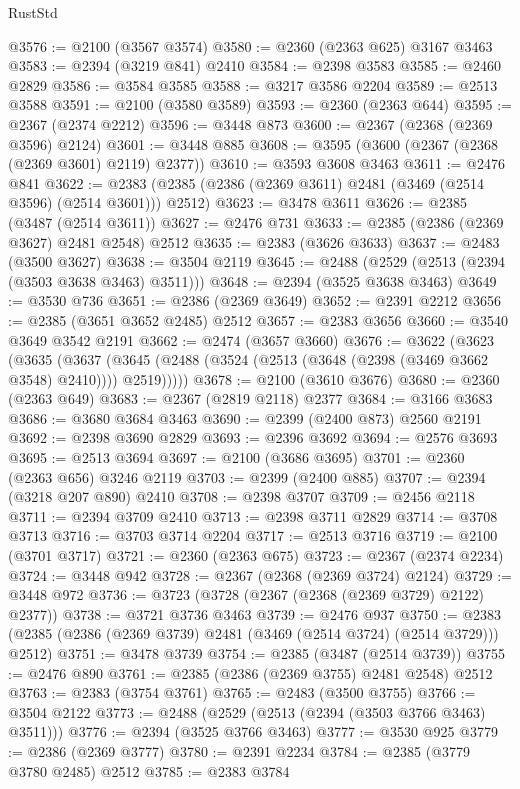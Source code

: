 \begin{lexlean}{RustStd}
\begin{coremodule}
{\begin{coremodule}
{{{{{{{{{{{{{{{{{{{{{{{{{{{{{{{{{{{{{{{{{{{{{{{{{{@3576 := @2100 (@3567 @3574)
@3580 := @2360 (@2363 @625) @3167 @3463
@3583 := @2394 (@3219 @841) @2410
@3584 := @2398 @3583
@3585 := @2460 @2829
@3586 := @3584 @3585
@3588 := @3217 @3586 @2204
@3589 := @2513 @3588
@3591 := @2100 (@3580 @3589)
@3593 := @2360 (@2363 @644)
@3595 := @2367 (@2374 @2212)
@3596 := @3448 @873
@3600 := @2367 (@2368 (@2369 @3596) @2124)
@3601 := @3448 @885
@3608 := @3595 (@3600 (@2367 (@2368 (@2369 @3601) @2119) @2377))
@3610 := @3593 @3608 @3463
@3611 := @2476 @841
@3622 := @2383 (@2385 (@2386 (@2369 @3611) @2481 (@3469 (@2514 @3596) (@2514 @3601))) @2512)
@3623 := @3478 @3611
@3626 := @2385 (@3487 (@2514 @3611))
@3627 := @2476 @731
@3633 := @2385 (@2386 (@2369 @3627) @2481 @2548) @2512
@3635 := @2383 (@3626 @3633)
@3637 := @2483 (@3500 @3627)
@3638 := @3504 @2119
@3645 := @2488 (@2529 (@2513 (@2394 (@3503 @3638 @3463) @3511)))
@3648 := @2394 (@3525 @3638 @3463)
@3649 := @3530 @736
@3651 := @2386 (@2369 @3649)
@3652 := @2391 @2212
@3656 := @2385 (@3651 @3652 @2485) @2512
@3657 := @2383 @3656
@3660 := @3540 @3649 @3542 @2191
@3662 := @2474 (@3657 @3660)
@3676 := @3622
    (@3623
      (@3635
        (@3637 (@3645 (@2488 (@3524 (@2513 (@3648 (@2398 (@3469 @3662 @3548) @2410)))) @2519)))))
@3678 := @2100 (@3610 @3676)
@3680 := @2360 (@2363 @649)
@3683 := @2367 (@2819 @2118) @2377
@3684 := @3166 @3683
@3686 := @3680 @3684 @3463
@3690 := @2399 (@2400 @873) @2560 @2191
@3692 := @2398 @3690 @2829
@3693 := @2396 @3692
@3694 := @2576 @3693
@3695 := @2513 @3694
@3697 := @2100 (@3686 @3695)
@3701 := @2360 (@2363 @656) @3246 @2119
@3703 := @2399 (@2400 @885)
@3707 := @2394 (@3218 @207 @890) @2410
@3708 := @2398 @3707
@3709 := @2456 @2118
@3711 := @2394 @3709 @2410
@3713 := @2398 @3711 @2829
@3714 := @3708 @3713
@3716 := @3703 @3714 @2204
@3717 := @2513 @3716
@3719 := @2100 (@3701 @3717)
@3721 := @2360 (@2363 @675)
@3723 := @2367 (@2374 @2234)
@3724 := @3448 @942
@3728 := @2367 (@2368 (@2369 @3724) @2124)
@3729 := @3448 @972
@3736 := @3723 (@3728 (@2367 (@2368 (@2369 @3729) @2122) @2377))
@3738 := @3721 @3736 @3463
@3739 := @2476 @937
@3750 := @2383 (@2385 (@2386 (@2369 @3739) @2481 (@3469 (@2514 @3724) (@2514 @3729))) @2512)
@3751 := @3478 @3739
@3754 := @2385 (@3487 (@2514 @3739))
@3755 := @2476 @890
@3761 := @2385 (@2386 (@2369 @3755) @2481 @2548) @2512
@3763 := @2383 (@3754 @3761)
@3765 := @2483 (@3500 @3755)
@3766 := @3504 @2122
@3773 := @2488 (@2529 (@2513 (@2394 (@3503 @3766 @3463) @3511)))
@3776 := @2394 (@3525 @3766 @3463)
@3777 := @3530 @925
@3779 := @2386 (@2369 @3777)
@3780 := @2391 @2234
@3784 := @2385 (@3779 @3780 @2485) @2512
@3785 := @2383 @3784
}}}}}}}}}}}}}}}}}}}}}}}}}}}}}}}}}}}}}}}}}}}}}}}}}}
\end{coremodule}}
\end{coremodule}
\end{lexlean}
